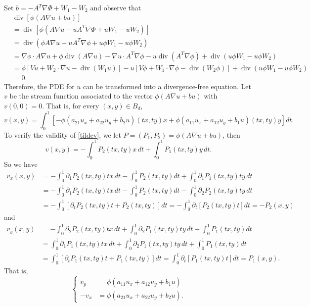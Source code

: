 \documentclass[12pt,reqno]{amsart}
\theoremstyle{plain}
\theoremstyle{definition}
\DeclareMathOperator{\di}{div}
\newcommand{\del}{ \partial}
\newcommand{\gr}{\nabla}
\newcommand{\brac}[1]{\left[#1\right]}
\newcommand{\pr}[1]{\left( #1 \right) }
\begin{document}
Set $b =- A^T \gr \Phi + W_1 - W_2$ and observe that
\begin{align*}
&\di \brac{ \phi \pr{ A\gr u + b u}}  \\
&= \di \brac{ \phi \pr{ A\gr u - u A^T \gr \Phi + u W_1 - u W_2 }}  \\
&=\di \pr{ \phi A\gr u - u A^T \gr \phi + u \phi W_1 - u \phi W_2 } \\
&=\gr \phi \cdot A \gr u + \phi \di\pr{A \gr u} - \gr u \cdot A^T \gr \phi - u \di\pr{A^T \gr \phi}+ \di \pr{ u \phi W_1 - u \phi W_2 } \\
&= \phi \brac{Vu + W_2 \cdot \gr u - \di\pr{W_1 u}} - u \brac{V \phi + W_1 \cdot \gr \phi - \di\pr{W_2 \phi}} + \di \pr{ u \phi W_1 - u \phi W_2 } \\
&=0.
\end{align*}
Therefore, the PDE for $u$ can be transformed into a divergence-free equation.
Let $v$ be the stream function associated to the vector $\phi \pr{A \gr u + b u}$ with $v\pr{0,0} = 0$.
That is, for every $\pr{x,y} \in B_d$, 
\begin{equation}
v\pr{x,y} = \int_0^1 \brac{- \phi \pr{a_{21} u_x + a_{22} u_y + b_2 u}\pr{tx,ty} x + \phi \pr{a_{11} u_x + a_{12} u_y + b_1 u }\pr{tx,ty}y} dt. 
\label{tildev}
\end{equation}
To verify the validity of \eqref{tildev}, we let $P = \pr{P_1, P_2} = \phi \pr{A \gr u + b u}$, then
\begin{equation*}
v\pr{x,y} = -\int_0^1P_2\pr{tx,ty} x \, dt +  \int_0^1 P_1\pr{tx,ty}y \, dt.
\end{equation*}
So we have
\begin{align*}
v_{x}\pr{x,y} 
&=  -\int_0^1 \del_1P_2\pr{tx,ty} t x \,dt - \int_0^1 P_2\pr{tx,ty} dt + \int_0^1\del_1P_1\pr{tx,ty} ty \, dt \\
&=  -\int_0^1 \del_1P_2\pr{tx,ty} t x \,dt - \int_0^1 P_2\pr{tx,ty} dt - \int_0^1\del_2P_2\pr{tx,ty} ty \, dt \\
&= - \int_0^1 \brac{\del_t P_2\pr{tx,ty} t + P_2\pr{tx,ty} } dt
= - \int_0^1 \del_t \brac{P_2\pr{tx,ty} t } dt 
= - P_2\pr{x,y}
\end{align*}
and
\begin{align*}
v_y\pr{x,y} 
&= - \int_0^1\del_2 P_2\pr{tx,ty} t x\,dt + \int_0^1 \del_2 P_1\pr{tx,ty} ty\,dt + \int_0^1 P_1\pr{tx,ty} dt \\
&=  \int_0^1\del_1 P_1\pr{tx,ty} t x\,dt + \int_0^1 \del_2 P_1\pr{tx,ty} ty\,dt + \int_0^1 P_1\pr{tx,ty} dt \\
&= \int_0^1 \brac{ \del_t P_1\pr{tx,ty} t + P_1\pr{tx,ty} } dt
= \int_0^1  \del_t \brac{P_1\pr{tx,ty} t} dt
= P_1\pr{x,y}.
\end{align*}
That is,
\begin{equation}
\left\{\begin{array}{rl}
{v}_y &= \phi \pr{a_{11} u_x + a_{12}  u_y + b_1 u} \\
-{v}_x &= \phi \pr{a_{21} u_x + a_{22} u_y + b_2 u} .
\end{array}  \right.
\label{streamFunc}
\end{equation}
\end{document}
